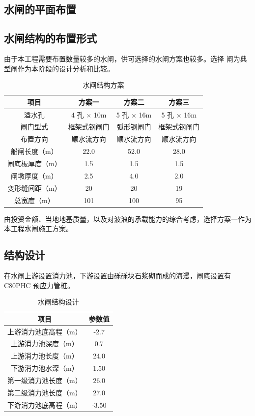 \documentclass[UTF8, a4paper, 12pt]{ctexart} %
\begin{document}
\subsection{水闸的平面布置}
\subsection{水闸结构的布置形式}

由于本工程需要布置数量较多的水闸，供可选择的水闸方案也较多。选择 闸为典型闸作为本阶段的设计分析和比较。

\begin{table}[h]
    \centering
    \caption{水闸结构方案}
    \begin{tabular}{|c|c|c|c|}
        \hline
        \textbf{项目} & \textbf{方案一} & \textbf{方案二} & \textbf{方案三} \\ \hline
        溢水孔 & 4 孔 $\times$ 10m & 5 孔 $\times$ 16m & 5 孔 $\times$ 16m \\ \hline
        闸门型式 & 框架式钢闸门 & 弧形钢闸门 & 框架式钢闸门 \\ \hline
        布置方向 & 顺水流方向 & 顺水流方向 & 顺水流方向 \\ \hline
        船闸长度（m） & 22.0 & 52.0 & 28.0 \\ \hline
        闸底板厚度（m） & 1.5 & 1.5 & 1.5 \\ \hline
        闸墩厚度（m） & 2.5 & 4.0 & 2.0 \\ \hline
        变形缝间距（m） & 20 & 20 & 19 \\ \hline
        总宽度（m） & 101 & 100 & 95 \\ \hline
    \end{tabular}
    \label{tab:sluice_structure_options}
\end{table}

由投资金额、当地地基质量，以及对波浪的承载能力的综合考虑，选择方案一作为本工程水闸施工方案。




\subsection{结构设计}
在水闸上游设置消力池，下游设置由砾砾块石浆砌而成的海漫，闸底设置有 C80PHC 预应力管桩。

\begin{table}[h]
    \centering
    \caption{水闸结构设计}
    \begin{tabular}{|c|c|}
        \hline
        \textbf{项目} & \textbf{参数值} \\ \hline
        上游消力池底高程（m） & -2.7 \\ \hline
        上游消力池深度（m） & 0.7 \\ \hline
        上游消力池长度（m） & 24.0 \\ \hline
        下游消力池水深（m） & 1.50 \\ \hline
        第一级消力池长度（m） & 26.0 \\ \hline
        第二级消力池长度（m） & 27.0 \\ \hline
        下游消力池底高程（m） & -3.50 \\ \hline
    \end{tabular}
    \label{tab:sluice_structure_design}
\end{table}
\end{document}
